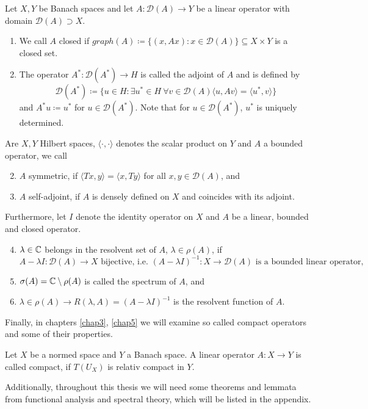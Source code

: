 \begin{definitions}
Let $X, Y$ be Banach spaces and let $A \colon \mathcal{D}(A) \rightarrow Y$ be a linear operator with domain $\mathcal{D}(A) \supset X$. 
\begin{enumerate}[label=\alph*\upshape)]
	\item We call $A$ closed if $graph(A) \coloneqq \{ (x, Ax) : x \in \mathcal{D}(A) \} \subseteq X \times Y$ is a closed set.
	\item The operator $A^{*} : \mathcal{D}(A^{*}) \rightarrow H $ is called the adjoint of $A$ and is defined by
		\[ \mathcal{D}(A^{*}) \coloneqq \{ u \in H : \exists u^{*} \in H ~\forall v \in \mathcal{D}(A) \langle u, A v \rangle = \langle u^{*} , v \rangle \} \]
		and $A^{*} u \coloneqq u^{*}$ for $u \in \mathcal{D}(A^{*})$. Note that for $u \in \mathcal{D}(A^{*})$, $u^{*}$ is uniquely determined. 
\end{enumerate}
Are $X, Y$ Hilbert spaces, $\langle \cdot, \cdot \rangle$ denotes the scalar product on $Y$ and $A$ a bounded operator, we call
\begin{enumerate}[label=\alph*\upshape)]  \setcounter{enumi}{1}
	\item $A$ symmetric, if $\langle Tx,y \rangle = \langle x ,Ty \rangle$ for all $x,y \in \mathcal{D}(A)$, and
	\item $A$ self-adjoint, if $A$ is densely defined on $X$ and coincides with its adjoint.
\end{enumerate}
Furthermore, let $I$ denote the identity operator on $X$ and $A$ be a linear, bounded and closed operator.
	\begin{enumerate}[label=\alph*\upshape)] \setcounter{enumi}{3}
		\item $\lambda \in \mathbb{C}$ belongs in the resolvent set of $A$, $\lambda \in \rho(A)$, if
			\[  A  - \lambda I \colon \mathcal{D}(A) \rightarrow X \text{ bijective, i.e. } (A - \lambda I)^{-1} \colon X \rightarrow \mathcal{D}(A) \text{ is a bounded linear operator,} \]
		\item $\sigma(A) = \mathbb{C} \setminus \rho(A)$ is called the spectrum of $A$, and
		\item $\lambda \in \rho(A) \rightarrow R(\lambda, A) = (A - \lambda I)^{-1}$ is the resolvent function of $A$.
	\end{enumerate}		
\end{definitions}

Finally, in chapters \ref{chap3}, \ref{chap5} we will examine so called compact operators and some of their properties.

\begin{definition}
	Let $X$ be a normed space and $Y$ a Banach space. A linear operator $A \colon X \rightarrow Y$ is called compact, if $T(U_{X})$ is relativ compact in $Y$.
\end{definition}

Additionally, throughout this thesis we will need some theorems and lemmata from functional analysis and spectral theory, which will be listed in the appendix.